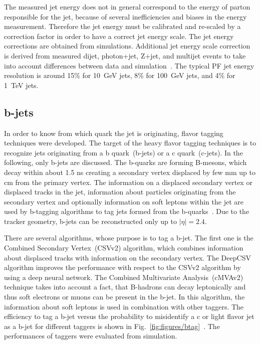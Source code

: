 The measured jet energy does not in general correspond to the energy of parton responsible for the jet, because of several inefficiencies and biases in the energy measurement. Therefore the jet energy must be calibrated and re-scaled by a correction factor in order to have a correct jet energy scale. The jet energy corrections are obtained from simulations. Additional jet energy scale correction is derived from measured dijet, photon+jet, Z+jet, and multijet events to take into account differences between data and simulation~\cite{Khachatryan:2016kdb}. The typical PF jet energy resolution is around 15\% for 10~GeV jets, 8\% for 100~GeV jets, and 4\% for 1~TeV jets. %

\subsection{b-jets}

In order to know from which quark the jet is originating, flavor tagging techniques were developed. The target of the heavy flavor tagging techniques is to recognize jets originating from a b quark~(b-jets) or a c quark~(c-jets). In the following, only b-jets are discussed. The b-quarks are forming B-mesons, which decay within about 1.5 ns creating a secondary vertex  displaced by few mm up to cm from the primary vertex. The information on a displaced secondary vertex or displaced tracks in the jet, information about particles originating from the secondary vertex and optionally information on soft leptons within the jet are used by b-tagging algorithms to tag jets formed from the b-quarks~\cite{Sirunyan:2017ezt}. Due to the tracker geometry, b-jets can be reconstructed only up to $|\eta|=2.4$.

There are several algorithms, whose purpose is to tag a b-jet. The first one is the Combined Secondary Vertex~(CSVv2) algorithm, which combines information about displaced tracks with information on the secondary vertex. The DeepCSV algorithm improves the performance with respect to the CSVv2 algorithm by using a deep neural network. The Combined Multivariate Analysis~(cMVAv2) technique takes into account a fact, that B-hadrons can decay leptonically and thus soft electrons or muons can be present in the b-jet. In this algorithm, the information about soft leptons is used in combination with other taggers. The efficiency to tag a b-jet versus the probability to misidentify a c or light flavor jet as a b-jet for different taggers is shown in Fig.~\ref{fig:figures/btag}~\cite{Sirunyan:2017ezt}. The performances of taggers were evaluated from simulation.


